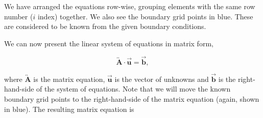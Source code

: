 \documentclass[11pt]{report}
\begin{document}
\vspace{0.3cm}
We have arranged the equations row-wise, grouping elements with the same row number ($i$ index) together. We 
also see the boundary grid points in blue. These are considered to be known from the given boundary conditions.
\newline

We can now present the linear system of equations in matrix form,

\begin{equation}
\overleftrightarrow{\textbf{A}} \cdot \overrightarrow{\textbf{u}} = \overrightarrow{\textbf{b}},
\end{equation}

\vspace{0.3cm}

where $\overleftrightarrow{\textbf{A}}$ is the matrix equation, $\overrightarrow{\textbf{u}}$ is the vector of unknowns and $\overrightarrow{\textbf{b}}$ is the right-hand-side of the system of equations. Note that we will move the known boundary grid points to the right-hand-side of the matrix equation (again, shown in blue). The resulting matrix equation is
\end{document}
